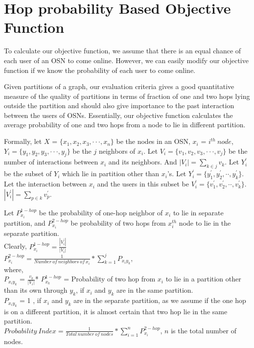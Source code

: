 \documentclass[letterpaper]{article}
\begin{document}
\section{Hop probability Based Objective Function}

   To calculate our objective function, we assume that there is an equal chance
of each user of an OSN to come online. However, we can easily modify our
objective function if we know the probability of each user to come online.

 Given partitions of a graph, our evaluation criteria gives a good
quantitative measure of the quality of partitions in terms of fraction of one and two hops
lying outside the partition and should also give importance to the past
interaction between the users of OSNs. Essentially, our objective function
calculates the average probability of one and two hops from a node to lie in different
partition. 

Formally, let $X$ = $\{x_1,x_2,x_3,\cdot\cdot\cdot,x_n\}$ be the nodes in an OSN, $x_i$ = $i^{th}\ node$, 
$Y_i=\{y_1, y_2, y_3,\cdot\cdot\cdot,y_j\}$ be the $j$ neighbors of $x_i$. Let $V_i=\{v_1, v_2, v_3, \cdot\cdot\cdot,
 v_j\}$ be the number of interactions between $x_i$ and its neighbors. And $|V_i| = \sum_{k\in j} v_k$.
 Let $Y^\prime_i$ be 
the subset of $Y_i$ which lie in partition other than $x_i$'s. Let $Y^\prime_i = \{y_1^\prime, y_2^\prime, \cdot\cdot, y_k^\prime\}$. 
Let the interaction between $x_i$ and the users in this subset be  $V^\prime_i = \{v_1^\prime, v_2^\prime, \cdot\cdot, v_k^\prime\}$.
$|V_i^\prime| = \sum_{p\in k} v_p^\prime$.

        Let $P_{x_i}^{1-hop}$ be the probability of one-hop neighbor of $x_i$ to lie in separate partition, and $P_{x_i}^{2-hop}$ be probability of two hops from $x_i^{th}$ node to lie in the separate partition.\\
        Clearly, $P_{x_i}^{1-hop}= \frac{|V_i^\prime|}{|V_i|}$ \\
        $P_{x_i}^{2-hop}=\frac{1}{Number\ of\ neighbors\ of\ x_i} * \displaystyle\sum_{k=1}^j P_{x_i y_k}$, \\
        where,\\
        $P_{x_i y_k}$ = $\frac{v_k}{|V_i|}$* $P_{x_{k}}^{1-hop}$ =  Probability of two hop from  $x_{i}$ to lie  in a  partition other than  its own through $y_k$, if $x_i$ and $y_{k}$ are in the same partition.\\
        $P_{x_i y_k}$ =  1 , if $x_i$ and $y_k$ are in the separate partition, as we assume if the one hop is on a different partition, it is almost
certain that two hop lie in the same partition.\\
        $Probability\ Index=\frac{1}{Total\ number\ of\ nodes}*\displaystyle\sum_{i=1}^nP_{x_i}^{2-hop}$, $n$ is the total number of nodes.\\
\end{document}
